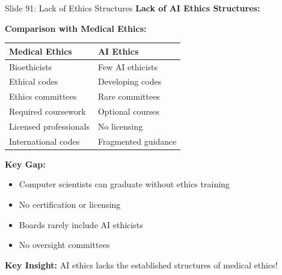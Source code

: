 \documentclass[8pt]{beamer}
\begin{document}
	\begin{frame}{Slide 91: Lack of Ethics Structures}
		\fontsize{6.5}{7.5}\selectfont
		\textbf{Lack of AI Ethics Structures:}
		
		\vspace{0.1cm}
		\textbf{Comparison with Medical Ethics:}
		\begin{tabular}{|p{4cm}|p{4cm}|}
			\hline
			\textbf{Medical Ethics} & \textbf{AI Ethics} \\
			\hline
			Bioethicists & Few AI ethicists \\
			Ethical codes & Developing codes \\
			Ethics committees & Rare committees \\
			Required coursework & Optional courses \\
			Licensed professionals & No licensing \\
			International codes & Fragmented guidance \\
			\hline
		\end{tabular}
		
		\vspace{0.1cm}
		\textbf{Key Gap:}
		\begin{itemize}
			\item Computer scientists can graduate without ethics training
			\item No certification or licensing
			\item Boards rarely include AI ethicists
			\item No oversight committees
		\end{itemize}
		
		\textcolor{myblue}{\textbf{Key Insight:}} AI ethics lacks the \textcolor{myblue}{established structures} of medical ethics!
	\end{frame}
	
\end{document}

